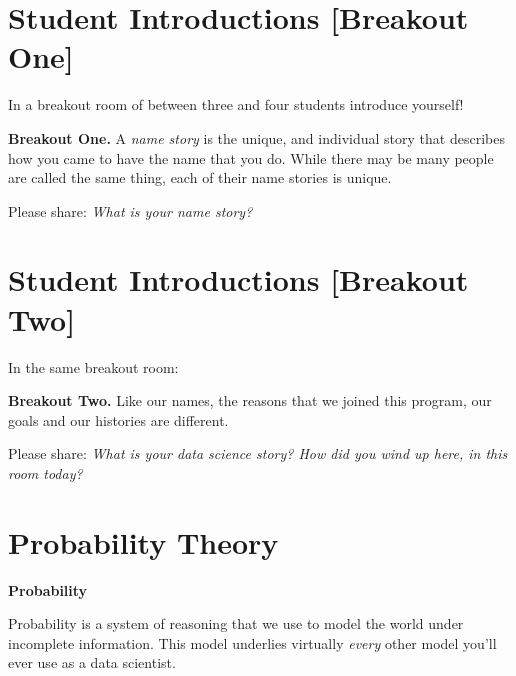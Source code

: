 \documentclass[
]{book}
\theoremstyle{definition}
\theoremstyle{definition}
\theoremstyle{definition}
\theoremstyle{definition}
\theoremstyle{remark}
\begin{document}
\hypertarget{student-introductions-breakout-one}{%
\section{Student Introductions {[}Breakout One{]}}\label{student-introductions-breakout-one}}

In a breakout room of between three and four students introduce yourself!

\begin{breakout}
\textbf{Breakout One.} A \emph{name story} is the unique, and individual story that describes how you came to have the name that you do. While there may be many people are called the same thing, each of their name stories is unique.

Please share: \emph{What is your name story?}

\end{breakout}

\hypertarget{student-introductions-breakout-two}{%
\section{Student Introductions {[}Breakout Two{]}}\label{student-introductions-breakout-two}}

In the same breakout room:

\begin{breakout}
\textbf{Breakout Two.}
Like our names, the reasons that we joined this program, our goals and our histories are different.

Please share: \emph{What is your data science story? How did you wind up here, in this room today?}

\end{breakout}

\hypertarget{probability-theory}{%
\section{Probability Theory}\label{probability-theory}}

\textbf{Probability}

Probability is a system of reasoning that we use to model the world under incomplete information. This model underlies virtually \emph{every} other model you'll ever use as a data scientist.
\end{document}
